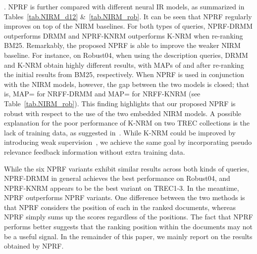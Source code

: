 \documentclass[11pt,a4paper]{article}
\begin{document}
. 
NPRF is further compared with different neural IR models, as summarized in Tables~\ref{tab.NIRM_d12} \&~\ref{tab.NIRM_rob}. 
It can be seen that NPRF regularly improves on top of the NIRM baselines. 
For both types of queries, NPRF-DRMM outperforms DRMM and NPRF-KNRM outperforms K-NRM when re-ranking BM25.
Remarkably, the proposed NPRF is able to improve the weaker NIRM baseline. 
For instance, on Robust04,
when using the description queries, 
DRMM and K-NRM obtain highly different results, 
with MAPs of  and  after re-ranking the initial results from BM25, respectively.
When NPRF is used in conjunction with the NIRM models, however, 
the gap between the two models is closed; that is, 
MAP= for NRFF-DRMM and MAP= for NRFF-KNRM (see Table~\ref{tab.NIRM_rob}). 
This finding highlights that our proposed NPRF is robust with respect to the use of the two embedded NIRM models. A possible explanation 
for the poor performance of K-NRM on two TREC collections is the lack of training data, as suggested in~\cite{DBLP:conf/wsdm/DaiXC018}. While K-NRM could be improved by introducing weak supervision~\cite{DBLP:conf/wsdm/DaiXC018}, we achieve the same goal by incorporating pseudo relevance feedback information without extra training data.

While the six NPRF variants exhibit similar results across both kinds of queries, NPRF-DRMM in general achieves 
the best performance on Robust04, and NPRF-KNRM appears to be the best variant on TREC1-3. In the meantime,
NPRF outperforms NPRF variants. 
One difference between the two methods is that NPRF considers the position of each  in the  ranked documents, whereas NPRF simply sums up the scores regardless of the positions. The fact that NPRF performs better suggests
that the ranking position within the  documents may not be a useful signal.
In the remainder of this paper, we mainly report on the results obtained by NPRF.
\end{document}
